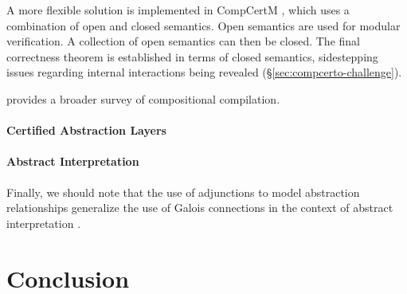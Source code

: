 \documentclass[acmsmall,review,anonymous]{acmart}\settopmatter{printfolios=true,printccs=false,printacmref=false}
\begin{document}
A more flexible solution is implemented in CompCertM \cite{compcertm},
which uses a combination of open and closed semantics.
Open semantics are used for modular verification.
A collection of open semantics can then be closed.
The final correctness theorem is established in terms of closed semantics,
sidestepping issues regarding internal interactions
being revealed (\S\ref{sec:compcerto-challenge}).

\citet{next700} provides a broader survey of compositional compilation.

\paragraph{Certified Abstraction Layers}




\paragraph{Abstract Interpretation}

Finally, we should note that the use of adjunctions to model
abstraction relationships
generalize the use of Galois connections
in the context of abstract interpretation
\cite{absint,aif}.



\section{Conclusion} %


% 


\newpage
\appendix
\end{document}
